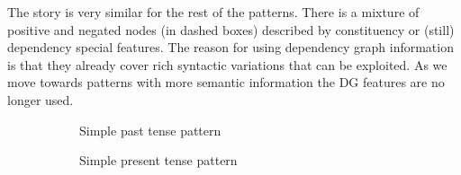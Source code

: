     The story is very similar for the rest of the patterns. There is a mixture of positive and negated nodes (in dashed boxes) described by constituency or (still) dependency special features. The reason for using dependency graph information is that they already cover rich syntactic variations that can be exploited. As we move towards patterns with more semantic information the DG features are no longer used.
    
    \begin{figure}[!ht]
        \centering
        \begin{subfigure}[t]{0.47\textwidth}
            \centering
            \caption{Simple past tense pattern}
            \label{fig:past-tense-pattern1}
        \end{subfigure}
        \begin{subfigure}[t]{0.47\textwidth}
            \centering
            \caption{Simple present tense pattern}
            \label{fig:present-tense-pattern1}
        \end{subfigure}
        \begin{subfigure}[t]{0.47\textwidth}
            \centering
\end{subfigure}
\end{figure}
